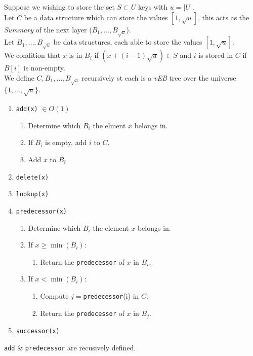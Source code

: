 \documentclass[11pt,a4paper]{article}
\begin{document}
Suppose we wishing to store the set $S\subset U$ keys with $u=|U|$.\\
Let $C$ be a data structure which can store the values $[1,\sqrt{u}]$, this acts as the \textit{Summary} of the next layer ($B_1,\dots,B_{\sqrt{u}}$).\\
Let $B_1,\dots,B_{\sqrt{u}}$ be data structures, each able to store the values $[1,\sqrt{u}]$.\\
We condition that $x$ is in $B_i$ if $(x+(i-1)\sqrt{u})\in S$ and $i$ is stored in $C$ if $B[i]$ is non-empty.\\
We define $C,B_1,\dots,B_{\sqrt{u}}$ recursively st each is a \textit{vEB} tree over the universe $\{1,\dots,\sqrt{u}\}$.\\
\begin{enumerate}
	\item \lstinline!add(x)! $\in O(1)$
	\begin{enumerate}
		\item Determine which $B_i$ the elment $x$ belongs in.
		\item If $B_i$ is empty, add $i$ to $C$.
		\item Add $x$ to $B_i$.
	\end{enumerate}
	\item \lstinline!delete(x)!
	\item \lstinline!lookup(x)!
	\item \lstinline!predecessor(x)!
	\begin{enumerate}
		\item Determine which $B_i$ the element $x$ belongs in.
		\item If $x\geq\min(B_i)$:
		\begin{enumerate}
			\item Return the \lstinline!predecessor! of $x$ in $B_i$.
		\end{enumerate}
		\item If $x<\min(B_i)$:
		\begin{enumerate}
			\item Compute $j=$\lstinline!predecessor!(i) in $C$.
			\item Return the \lstinline!predecessor! of $x$ in $B_j$.
		\end{enumerate}
	\end{enumerate}
	\item \lstinline!successor(x)! 
\end{enumerate}
\nb \lstinline!add! \& \lstinline!predecessor! are recusively defined.\\
\end{document}
